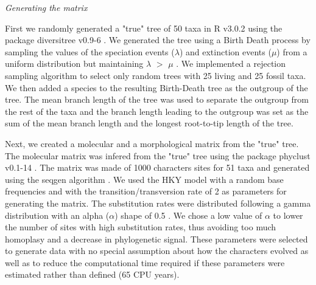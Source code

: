\documentclass[12pt,letterpaper]{article}
\renewcommand{\subsection}[1]{%
\bigskip
\begin{center}
\begin{large}
\normalfont\itshape #1
\end{large}
\end{center}}
\begin{document}
\subsection{Generating the matrix}
First we randomly generated a "true" tree of 50 taxa in R v3.0.2 \citep{R302} using the package diversitree v0.9-6 \citep{fitzjohndiversitree2012}. We generated the tree using a Birth Death process by sampling the values of the speciation events ($\lambda$) and extinction events ($\mu$) from a uniform distribution but maintaining $\lambda$ $>$ $\mu$ \citep{paradistime-dependent2011}. We implemented a rejection sampling algorithm to select only random trees with 25 living and 25 fossil taxa. We then added a species to the resulting Birth-Death tree as the outgroup of the tree. The mean branch length of the tree was used to separate the outgroup from the rest of the taxa and the branch length leading to the outgroup was set as the sum of the mean branch length and the longest root-to-tip length of the tree.

Next, we created a molecular and a morphological matrix from the "true" tree. The molecular matrix was infered from the "true" tree using the package phyclust v0.1-14 \citep{chen2011}. The matrix was made of 1000 characters sites for 51 taxa and generated using the seqgen algorithm \citep{ ranbaut1997seqgen}. We used the HKY model \citep{HKY85} with a random base frequencies and with the transition/transversion rate of 2 \citep{douadycomparison2003} as parameters for generating the matrix. The substitution rates were distributed following a gamma distribution with an alpha ($\alpha$) shape of 0.5 \citep{yangamong-site1996}. We chose a low value of $\alpha$ to lower the number of sites with high substitution rates, thus avoiding too much homoplasy and a decrease in phylogenetic signal. These parameters were selected to generate data with no special assumption about how the characters evolved as well as to reduce the computational time required if these parameters were estimated rather than defined (65 CPU years).
\end{document}
